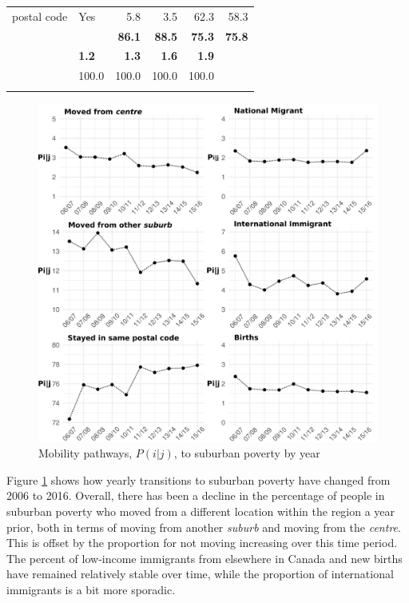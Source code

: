 \begin{table}[h]
\begin{center}
\begin{tabular}{llrrrr}
			postal code & Yes             & 5.8          & 3.5          & 62.3        & 58.3      \\
			\multicolumn{2}{l}{}                        & \textbf{86.1}         & \textbf{88.5}         & \textbf{75.3}        & \textbf{75.8}      \\ \arrayrulecolor{lightgray}\hline
			\multicolumn{2}{l}{Births}                  &\textbf{ 1.2}         & \textbf{1.3}          & \textbf{1.6}         & \textbf{1.9}      \\ \arrayrulecolor{black}\hline
			\multicolumn{2}{l}{Total}                   & 100.0        & 100.0        & 100.0       & 100.0   \\ \arrayrulecolor{black}\hline
		\end{tabular}
	\end{center}
\end{table}






\begin{figure}[H]
	\centering
	\includegraphics[width=4.9in]{figures/transitions_by_year.png}
	\caption{Mobility pathways, $P(i|j)$, to suburban poverty by year}
	\label{fig:tbyr}
\end{figure}


Figure \ref{fig:tbyr} shows how yearly transitions to suburban poverty have changed from 2006 to 2016. Overall, there has been a decline in the percentage of people in suburban poverty who moved from a different location within the region a year prior, both in terms of moving from another \textit{suburb} and moving from the \textit{centre}. This is offset by the proportion for not moving increasing over this time period. The percent of low-income immigrants from elsewhere in Canada and new births have remained relatively stable over time, while the proportion of international immigrants is a bit more sporadic.



